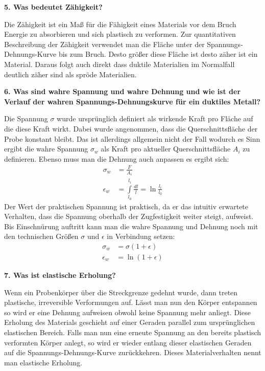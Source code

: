 \noindent\textbf{5. Was bedeutet Zähigkeit?}\\
\begin{addmargin}[25pt]{0pt}
Die Zähigkeit ist ein Maß für die Fähigkeit eines Materials vor dem Bruch Energie zu absorbieren und sich plastisch zu verformen. Zur quantitativen Beschreibung der Zähigkeit verwendet man die Fläche unter der Spannungs-Dehnungs-Kurve bis zum Bruch. Desto größer diese Fläche ist desto zäher ist ein Material. Daraus folgt auch direkt dass duktile Materialien im Normalfall deutlich zäher sind als spröde Materialien. \\
\end{addmargin}

\noindent\textbf{6. Was sind wahre Spannung und wahre Dehnung und wie ist der Verlauf der wahren Spannungs-Dehnungskurve für ein duktiles Metall?}\\
\begin{addmargin}[25pt]{0pt}
Die Spannung $\sigma$ wurde ursprünglich definiert als wirkende Kraft pro Fläche auf die diese Kraft wirkt. Dabei wurde angenommen, dass die Querschnittsfläche der Probe konstant bleibt. Das ist allerdings allgemein nicht der Fall wodurch es Sinn ergibt die wahre Spannung $\sigma_w$ als Kraft pro aktueller Querschnittsfläche $A_i$ zu definieren. Ebenso muss man die Dehnung auch anpassen es ergibt sich: 
\begin{align}\label{eq:wahre_Spannung}
    \sigma_w &= \frac{F}{A_i}\\\label{eq:wahre_Dehnung}
    \epsilon_w &= \int\limits_{l_0}^{l_i} \frac{\si{d}l}{l} = \ln \frac{l_i}{l_0}
\end{align}
Der Wert der praktischen Spannung ist praktisch, da er das intuitiv erwartete Verhalten, dass die Spannung oberhalb der Zugfestigkeit weiter steigt, aufweist. Bis Einschnürung auftritt kann man die wahre Spannung und Dehnung noch mit den technischen Größen $\sigma$ und $\epsilon$ in Verbindung setzen:
\begin{align}\label{eq:wahre_Spannung_mit_technischen_Größen}
    \sigma_w &= \sigma(1+\epsilon)\\ \label{eq:wahre_Dehnung_mit_technischen_Größen}
    \epsilon_w &= \ln (1+\epsilon)
\end{align}
\end{addmargin}

\noindent\textbf{7. Was ist elastische Erholung?}\\
\begin{addmargin}[25pt]{0pt}
Wenn ein Probenkörper über die Streckgrenze gedehnt wurde, dann treten plastische, irreversible Verformungen auf. Lässt man nun den Körper entspannen so wird er eine Dehnung aufweisen obwohl keine Spannung mehr anliegt. Diese Erholung des Materials geschieht auf einer Geraden parallel zum ursprünglichen elastischen Bereich. Falls man nun eine erneute Spannung an den bereits plastisch verformten Körper anlegt, so wird er wieder entlang dieser elastischen Geraden auf die Spannungs-Dehnungs-Kurve zurückkehren. Dieses Materialverhalten nennt man elastische Erholung.\\
\end{addmargin}

